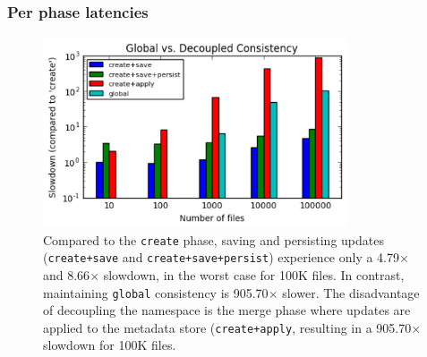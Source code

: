 \subsubsection{Per phase latencies}
\begin{figure}[tb]
\centering
\includegraphics[width=90mm]{figures/global-v-decoupled.png}
\caption{Compared to the \texttt{create} phase, saving and persisting
updates (\texttt{create+save} and \texttt{create+save+persist}) experience only
a 4.79\(\times\) and 8.66\(\times\) slowdown, in the worst case for 100K files.
In contrast, maintaining \texttt{global} consistency is 905.70\(\times\)
slower.  The disadvantage of decoupling the namespace is the merge phase where
updates are applied to the metadata store (\texttt{create+apply}, resulting in a
905.70\(\times\) slowdown for 100K files.}\label{fig:global-v-decoupled}
\end{figure}

